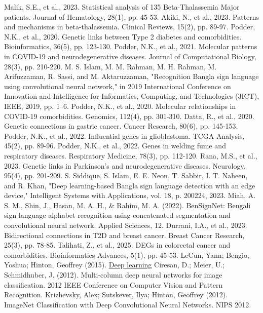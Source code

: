 \documentclass[a4paper,12pt,leqno,openbib,oneside]{memoir}
\theoremstyle{plain}
\theoremstyle{plain}
\theoremstyle{plain}
\theoremstyle{definition}
\theoremstyle{plain}
\theoremstyle{plain}
\theoremstyle{plain}
\begin{document}
\begin{thebibliography}{99}
 Malik, S.E., et al., 2023. Statistical analysis of 135 Beta-Thalassemia Major patients. Journal of Hematology, 28(1), pp. 45-53.
 Akiki, N., et al., 2023. Patterns and mechanisms in beta-thalassemia. Clinical Reviews, 15(2), pp. 89-97.
 Podder, N.K., et al., 2020. Genetic links between Type 2 diabetes and comorbidities. Bioinformatics, 36(5), pp. 123-130.
 Podder, N.K., et al., 2021. Molecular patterns in COVID-19 and neurodegenerative diseases. Journal of Computational Biology, 28(3), pp. 210-220.
 M. S. Islam, M. M. Rahman, M. H. Rahman, M. Arifuzzaman, R. Sassi, and M. Aktaruzzaman, "Recognition Bangla sign language using convolutional neural network," in 2019 International Conference on Innovation and Intelligence for Informatics, Computing, and Technologies (3ICT), IEEE, 2019, pp. 1–6.
 Podder, N.K., et al., 2020. Molecular relationships in COVID-19 comorbidities. Genomics, 112(4), pp. 301-310.
 Datta, R., et al., 2020. Genetic connections in gastric cancer. Cancer Research, 80(6), pp. 145-153.
 Podder, N.K., et al., 2022. Influential genes in glioblastoma. TCGA Analysis, 45(2), pp. 89-96.
 Podder, N.K., et al., 2022. Genes in welding fume and respiratory diseases. Respiratory Medicine, 78(3), pp. 112-120.
 Rana, M.S., et al., 2023. Genetic links in Parkinson’s and neurodegenerative diseases. Neurology, 95(4), pp. 201-209.
 S. Siddique, S. Islam, E. E. Neon, T. Sabbir, I. T. Naheen, and R. Khan, "Deep learning-based Bangla sign language detection with an edge device," Intelligent Systems with Applications, vol. 18, p. 200224, 2023.
 Miah, A. S. M., Shin, J., Hasan, M. A. H., \& Rahim, M. A. (2022). BenSignNet: Bengali sign language alphabet recognition using concatenated segmentation and convolutional neural network. Applied Sciences, 12.
 Durrani, I.A., et al., 2023. Bidirectional connections in T2D and breast cancer. Breast Cancer Research, 25(3), pp. 78-85.
 Talihati, Z., et al., 2025. DEGs in colorectal cancer and comorbidities. Bioinformatics Advances, 5(1), pp. 45-53.
 LeCun, Yann; Bengio, Yoshua; Hinton, Geoffrey (2015). \href{https://hal.science/hal-04206682/file/Lecun2015.pdf} {Deep learning}
 Ciresan, D.; Meier, U.; Schmidhuber, J. (2012). Multi-column deep neural networks for image classification. 2012 IEEE Conference on Computer Vision and Pattern Recognition.
 Krizhevsky, Alex; Sutskever, Ilya; Hinton, Geoffrey (2012). ImageNet Classification with Deep Convolutional Neural Networks. NIPS 2012.

\end{thebibliography}
\end{document}
